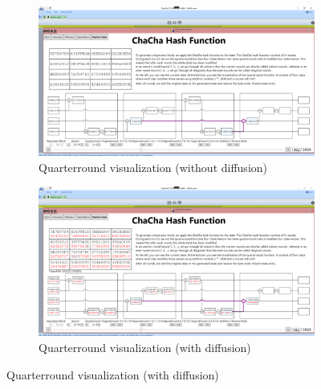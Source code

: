 \begin{figure}
\caption{Quarterround visualization during ChaCha hash function}
\label{fig:chachahash.mid.qr}
\centering
\begin{subfigure}{\textwidth}
  \centering
  \includegraphics[width=\textwidth]{figures/chachahash/chachahash-mid-qr}
  \caption{Quarterround visualization (without diffusion)}
  \label{fig:chachahash.mid.qr}
\end{subfigure}
\begin{subfigure}{\textwidth}
  \centering
  \includegraphics[width=\textwidth]{figures/chachahash/chachahash-mid-qr-diffusion}
  \caption{Quarterround visualization (with diffusion)}
  \label{fig:chachahash.mid.qr.diffusion}
\end{subfigure}

\end{figure}

